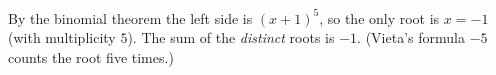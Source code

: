 By the binomial theorem the left side is $(x+1)^5$, so the only root is $x=-1$ (with multiplicity $5$). The sum of the \emph{distinct} roots is $\boxed{-1}$. (Vieta's formula $-5$ counts the root five times.)
